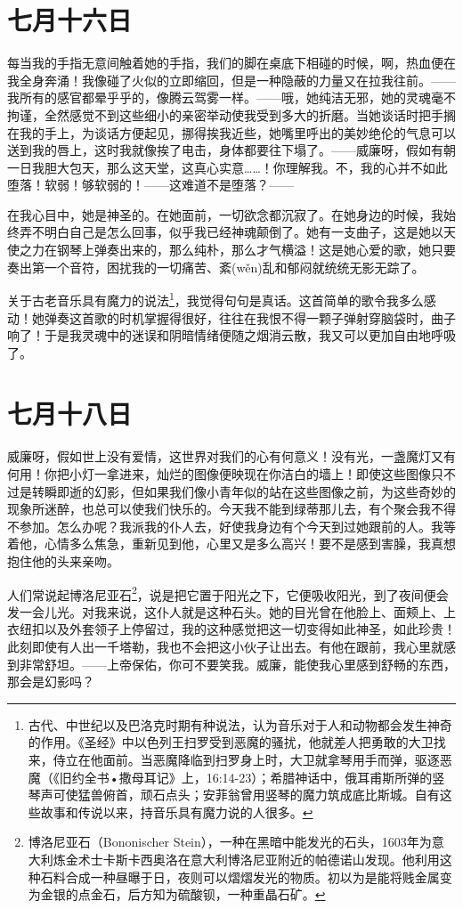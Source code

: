 \documentclass[12pt,oneside]{book}
\begin{document}
\chapter{七月十六日}
\label{sec-2-21}
每当我的手指无意间触着她的手指，我们的脚在桌底下相碰的时候，啊，热血便在我全身奔涌！我像碰了火似的立即缩回，但是一种隐蔽的力量又在拉我往前。——我所有的感官都晕乎乎的，像腾云驾雾一样。——哦，她纯洁无邪，她的灵魂毫不拘谨，全然感觉不到这些细小的亲密举动使我受到多大的折磨。当她谈话时把手搁在我的手上，为谈话方便起见，挪得挨我近些，她嘴里呼出的美妙绝伦的气息可以送到我的唇上，这时我就像挨了电击，身体都要往下塌了。——威廉呀，假如有朝一日我胆大包天，那么这天堂，这真心实意……！你理解我。不，我的心并不如此堕落！软弱！够软弱的！——这难道不是堕落？——

在我心目中，她是神圣的。在她面前，一切欲念都沉寂了。在她身边的时候，我始终弄不明白自己是怎么回事，似乎我已经神魂颠倒了。她有一支曲子，这是她以天使之力在钢琴上弹奏出来的，那么纯朴，那么才气横溢！这是她心爱的歌，她只要奏出第一个音符，困扰我的一切痛苦、紊(wěn)乱和郁闷就统统无影无踪了。

关于古老音乐具有魔力的说法\footnote{古代、中世纪以及巴洛克时期有种说法，认为音乐对于人和动物都会发生神奇的作用。《圣经》中以色列王扫罗受到恶魔的骚扰，他就差人把勇敢的大卫找来，侍立在他面前。当恶魔降临到扫罗身上时，大卫就拿琴用手而弹，驱逐恶魔（《旧约全书•撒母耳记》上，16:14-23）；希腊神话中，俄耳甫斯所弹的竖琴声可使猛兽俯首，顽石点头；安菲翁曾用竖琴的魔力筑成底比斯城。自有这些故事和传说以来，持音乐具有魔力说的人很多。}，我觉得句句是真话。这首简单的歌令我多么感动！她弹奏这首歌的时机掌握得很好，往往在我恨不得一颗子弹射穿脑袋时，曲子响了！于是我灵魂中的迷误和阴暗情绪便随之烟消云散，我又可以更加自由地呼吸了。
　　
\chapter{七月十八日}
\label{sec-2-22}
威廉呀，假如世上没有爱情，这世界对我们的心有何意义！没有光，一盏魔灯又有何用！你把小灯一拿进来，灿烂的图像便映现在你洁白的墙上！即使这些图像只不过是转瞬即逝的幻影，但如果我们像小青年似的站在这些图像之前，为这些奇妙的现象所迷醉，也总可以使我们快乐的。今天我不能到绿蒂那儿去，有个聚会我不得不参加。怎么办呢？我派我的仆人去，好使我身边有个今天到过她跟前的人。我等着他，心情多么焦急，重新见到他，心里又是多么高兴！要不是感到害臊，我真想抱住他的头来亲吻。

人们常说起博洛尼亚石\footnote{博洛尼亚石（Bononischer Stein），一种在黑暗中能发光的石头，1603年为意大利炼金术士卡斯卡西奥洛在意大利博洛尼亚附近的帕德诺山发现。他利用这种石料合成一种昼曝于日，夜则可以熠熠发光的物质。初以为是能将贱金属变为金银的点金石，后方知为硫酸钡，一种重晶石矿。}，说是把它置于阳光之下，它便吸收阳光，到了夜间便会发一会儿光。对我来说，这仆人就是这种石头。她的目光曾在他脸上、面颊上、上衣纽扣以及外套领子上停留过，我的这种感觉把这一切变得如此神圣，如此珍贵！此刻即使有人出一千塔勒，我也不会把这小伙子让出去。有他在跟前，我心里就感到非常舒坦。——上帝保佑，你可不要笑我。威廉，能使我心里感到舒畅的东西，那会是幻影吗？
　　
\end{document}
